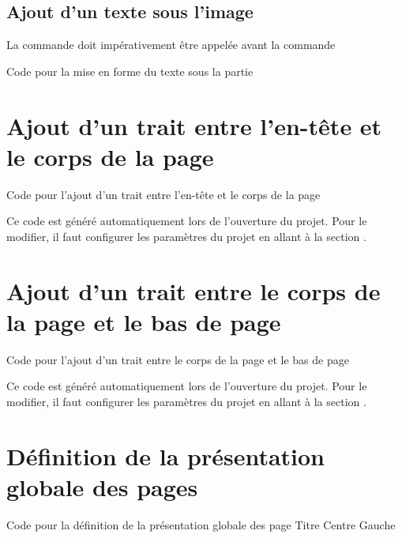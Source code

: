 \subsection{Ajout d'un texte sous l'image}
La commande  doit impérativement être appelée avant la commande 


\begin{Latex}{Code pour la mise en forme du texte sous la partie}
\end{Latex}


\section{Ajout d'un trait entre l'en-tête et le corps de la page}

\begin{Latex}{Code pour l'ajout d'un trait entre l'en-tête et le corps de la page}
\end{Latex}

Ce code est généré automatiquement lors de l'ouverture du projet. Pour le modifier, il faut configurer les paramètres du projet en allant à la section .

\section{Ajout d'un trait entre le corps de la page et le bas de page}

\begin{Latex}{Code pour l'ajout d'un trait entre le corps de la page et le bas de page}
\end{Latex}

Ce code est généré automatiquement lors de l'ouverture du projet. Pour le modifier, il faut configurer les paramètres du projet en allant à la section .



\section{Définition de la présentation globale des pages}

\begin{Latex}{Code pour la définition de la présentation globale des page}
  \addPresentation
  {Titre} {Centre} {\currentChapter}
  {Gauche} {} {\currentPage}
\end{Latex}

